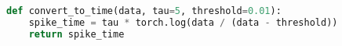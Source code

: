 \begin{lstlisting}[language=Python, caption={Code for RC model}]
def convert_to_time(data, tau=5, threshold=0.01):
	spike_time = tau * torch.log(data / (data - threshold))
	return spike_time
\end{lstlisting}
